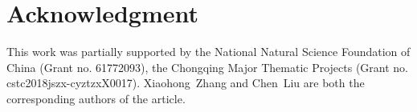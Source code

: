 \documentclass[journal]{IEEEtran}
\begin{document}
\section*{Acknowledgment}
This work was partially supported by the National Natural Science Foundation of China (Grant no. 61772093), the Chongqing Major Thematic Projects (Grant no. cstc2018jszx-cyztzxX0017). Xiaohong~Zhang and Chen~Liu are both the corresponding authors of the article.


\ifCLASSOPTIONcaptionsoff
  \newpage
\fi







%





% 

\end{document}

